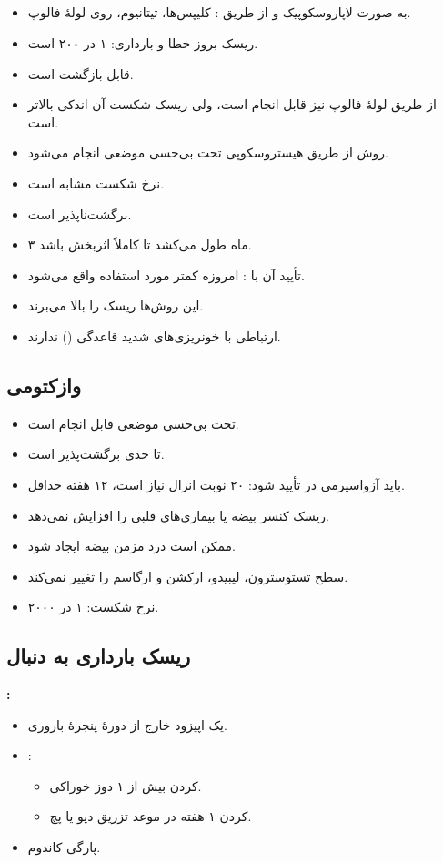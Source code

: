 \documentclass[12pt,a4paper]{article}
\begin{document}
\subsection*{}
\begin{itemize}
  \item به صورت لاپاروسکوپیک و از طریق : کلیپس‌ها، تیتانیوم، روی لولهٔ فالوپ.
  \item ریسک بروز خطا و بارداری: ۱ در ۲۰۰ است.
  \item قابل بازگشت است.
  \item از طریق  لولهٔ فالوپ نیز قابل انجام است، ولی ریسک شکست آن اندکی بالاتر است.
  \item روش  از طریق هیستروسکوپی تحت بی‌حسی موضعی انجام می‌شود.
  \item نرخ شکست مشابه  است.
  \item برگشت‌ناپذیر است.
  \item ۳ ماه طول می‌کشد تا کاملاً اثربخش باشد.
  \item تأیید آن با : امروزه کمتر مورد استفاده واقع می‌شود.
  \item این روش‌ها ریسک  را بالا می‌برند.
  \item ارتباطی با خونریزی‌های شدید قاعدگی () ندارند.
\end{itemize}

\subsection*{وازکتومی}
\begin{itemize}
  \item تحت بی‌حسی موضعی قابل انجام است.
  \item تا حدی برگشت‌پذیر است.
  \item باید آزواسپرمی در  تأیید شود: ۲۰ نوبت انزال نیاز است، ۱۲ هفته حداقل.
  \item ریسک کنسر بیضه یا بیماری‌های قلبی را افزایش نمی‌دهد.
  \item ممکن است درد مزمن بیضه ایجاد شود.
  \item سطح تستوسترون، لیبیدو، ارکشن و ارگاسم را تغییر نمی‌کند.
  \item نرخ شکست: ۱ در ۲۰۰۰.
\end{itemize}

\subsection*{ریسک بارداری به دنبال }
\textbf{:}
\begin{itemize}
  \item یک اپیزود  خارج از دورهٔ پنجرهٔ باروری.
  \item {}:
  \begin{itemize}
    \item {} کردن بیش از ۱ دوز  خوراکی.
    \item {} کردن ۱ هفته در موعد تزریق دپو یا پچ.
  \end{itemize}
  \item پارگی کاندوم.
\end{itemize}
\end{document}
